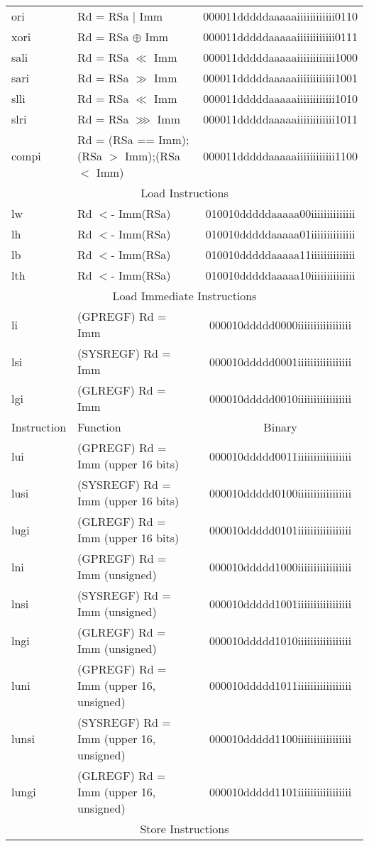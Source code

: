 \documentclass[letterpaper, 11pt]{article}
\begin{document}
\begin{center}
\begin{longtable}{|l|l|c|}
			ori			& Rd = RSa $|$ Imm 								& 000011dddddaaaaaiiiiiiiiiiii0110 \\
			xori		& Rd = RSa $\oplus$ Imm 						& 000011dddddaaaaaiiiiiiiiiiii0111 \\
			sali		& Rd = RSa $\ll$ Imm 							& 000011dddddaaaaaiiiiiiiiiiii1000 \\
			sari		& Rd = RSa $\gg$ Imm 							& 000011dddddaaaaaiiiiiiiiiiii1001 \\
			slli		& Rd = RSa $\ll$ Imm 							& 000011dddddaaaaaiiiiiiiiiiii1010 \\
			slri		& Rd = RSa $ \ggg  $ Imm 						& 000011dddddaaaaaiiiiiiiiiiii1011 \\
			compi		& Rd = (RSa == Imm);(RSa $>$ Imm);(RSa $<$ Imm)	& 000011dddddaaaaaiiiiiiiiiiii1100 \\
			\hline
			\multicolumn{3}{|c|}{Load Instructions} \\ \hline
			lw			& Rd $<$- Imm(RSa)								& 010010dddddaaaaa00iiiiiiiiiiiiii \\
			lh			& Rd $<$- Imm(RSa)								& 010010dddddaaaaa01iiiiiiiiiiiiii \\
			lb			& Rd $<$- Imm(RSa)								& 010010dddddaaaaa11iiiiiiiiiiiiii \\
			lth			& Rd $<$- Imm(RSa)								& 010010dddddaaaaa10iiiiiiiiiiiiii \\
			\hline
			\multicolumn{3}{|c|}{Load Immediate Instructions} \\ \hline
			li			& (GPREGF) Rd = Imm								& 000010ddddd0000iiiiiiiiiiiiiiiii \\
			lsi			& (SYSREGF) Rd = Imm							& 000010ddddd0001iiiiiiiiiiiiiiiii \\
			lgi			& (GLREGF) Rd = Imm								& 000010ddddd0010iiiiiiiiiiiiiiiii \\
			\hline
			Instruction & Function 										& Binary \\ \hline
			lui			& (GPREGF) Rd = Imm	(upper 16 bits)				& 000010ddddd0011iiiiiiiiiiiiiiiii \\
			lusi		& (SYSREGF) Rd = Imm (upper 16 bits)			& 000010ddddd0100iiiiiiiiiiiiiiiii \\
			lugi		& (GLREGF) Rd = Imm	 (upper 16 bits)			& 000010ddddd0101iiiiiiiiiiiiiiiii \\
			lni			& (GPREGF) Rd = Imm	(unsigned)					& 000010ddddd1000iiiiiiiiiiiiiiiii \\
			lnsi		& (SYSREGF) Rd = Imm (unsigned)					& 000010ddddd1001iiiiiiiiiiiiiiiii \\
			lngi		& (GLREGF) Rd = Imm (unsigned)					& 000010ddddd1010iiiiiiiiiiiiiiiii \\
			luni		& (GPREGF) Rd = Imm	 (upper 16, unsigned)		& 000010ddddd1011iiiiiiiiiiiiiiiii \\
			lunsi		& (SYSREGF) Rd = Imm (upper 16, unsigned)		& 000010ddddd1100iiiiiiiiiiiiiiiii \\
			lungi		& (GLREGF) Rd = Imm	(upper 16, unsigned)		& 000010ddddd1101iiiiiiiiiiiiiiiii \\
			\hline
			\multicolumn{3}{|c|}{Store Instructions} \\ \hline


\end{longtable}
\end{center}
\end{document}
